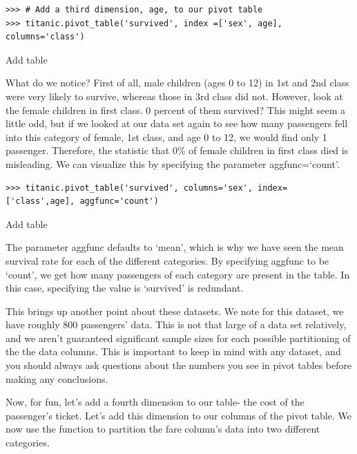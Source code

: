 \begin{lstlisting}
>>> # Add a third dimension, age, to our pivot table
>>> titanic.pivot_table('survived', index =['sex', age], columns='class')
\end{lstlisting}

Add table

What do we notice? First of all, male children (ages 0 to 12) in 1st and 2nd class were very likely to survive, whereas those in 3rd class did not. However, look at the female children in first class. 0 percent of them survived? This might seem a little odd, but if we looked at our data set again to see how many passengers fell into this category of female, 1st class, and age 0 to 12, we would find only 1 passenger. Therefore, the statistic that 0\% of female children in first class died is misleading. We can visualize this by specifying the parameter aggfunc=`count'.

\begin{lstlisting}
>>> titanic.pivot_table('survived', columns='sex', index=['class',age], aggfunc='count')
\end{lstlisting}

Add table

The parameter aggfunc defaults to `mean', which is why we have seen the mean survival rate for each of the different categories. By specifying aggfunc to be `count', we get how many passengers of each category are present in the table. In this case, specifying the value is `survived' is redundant.

This brings up another point about these datasets. We note for this dataset, we have roughly 800 passengers' data. This is not that large of a data set relatively, and we aren't guaranteed significant sample sizes for each possible partitioning of the the data columns. This is important to keep in mind with any dataset, and you should always ask questions about the numbers you see in pivot tables before making any conclusions.

Now, for fun, let's add a fourth dimension to our table- the cost of the passenger's ticket. Let's add this dimension to our columns of the pivot table. We now use the function  to partition the fare column's data into two different categories.

